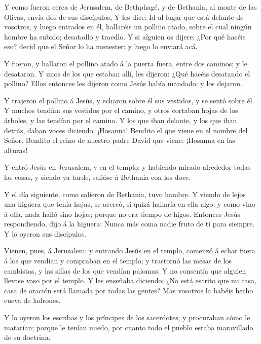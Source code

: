  Y como fueron cerca de Jerusalem, de Bethphagé, y de
Bethania, al monte de las Olivas, envía dos de sus discípulos,
 Y les dice: Id al lugar que está delante de vosotros, y
luego entrados en él, hallaréis un pollino atado, sobre el cual ningún
hombre ha subido; desatadlo y traedlo.  Y si alguien os
dijere: ¿Por qué hacéis eso? decid que el Señor lo ha menester: y luego
lo enviará acá.

 Y fueron, y hallaron el pollino atado á la puerta fuera,
entre dos caminos; y le desataron.  Y unos de los que
estaban allí, les dijeron: ¿Qué hacéis desatando el pollino?
 Ellos entonces les dijeron como Jesús había mandado: y los
dejaron.

 Y trajeron el pollino á Jesús, y echaron sobre él sus
vestidos, y se sentó sobre él.  Y muchos tendían sus
vestidos por el camino, y otros cortaban hojas de los árboles, y las
tendían por el camino.  Y los que iban delante, y los que
iban detrás, daban voces diciendo: ¡Hosanna! Bendito el que viene en el
nombre del Señor.  Bendito el reino de nuestro padre David
que viene: ¡Hosanna en las alturas!

 Y entró Jesús en Jerusalem, y en el templo: y habiendo
mirado alrededor todas las cosas, y siendo ya tarde, salióse á Bethania
con los doce.

 Y el día siguiente, como salieron de Bethania, tuvo
hambre.  Y viendo de lejos una higuera que tenía hojas, se
acercó, si quizá hallaría en ella algo: y como vino á ella, nada halló
sino hojas; porque no era tiempo de higos.  Entonces Jesús
respondiendo, dijo á la higuera: Nunca más coma nadie fruto de ti para
siempre. Y lo oyeron sus discípulos.

 Vienen, pues, á Jerusalem; y entrando Jesús en el templo,
comenzó á echar fuera á los que vendían y compraban en el templo; y
trastornó las mesas de los cambistas, y las sillas de los que vendían
palomas;  Y no consentía que alguien llevase vaso por el
templo.  Y les enseñaba diciendo: ¿No está escrito que mi
casa, casa de oración será llamada por todas las gentes? Mas vosotros la
habéis hecho cueva de ladrones.

 Y lo oyeron los escribas y los príncipes de los
sacerdotes, y procuraban cómo le matarían; porque le tenían miedo, por
cuanto todo el pueblo estaba maravillado de su doctrina.


